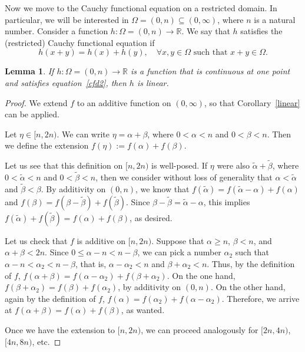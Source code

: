\documentclass[12pt,reqno]{amsart}
\theoremstyle{plain}
\newtheorem{lemma}[theorem]{Lemma} %
\numberwithin{equation}{section} %
\begin{document}
Now we move to the Cauchy functional equation on a restricted domain. In particular, we will be interested in $\Omega=(0,n)\subseteq (0,\infty)$, where $n$ is a natural number. Consider a function $h:\Omega=(0,n)\rightarrow\mathbb{R}$. We say that $h$ satisfies the (restricted) Cauchy functional equation if 
\begin{equation} h(x+y)=h(x)+h(y),\quad \forall x,y\in\Omega\text{ such that }x+y\in\Omega. 
\label{cfd2}
\end{equation}

\begin{lemma} \label{cfr}
If $h:\Omega=(0,n)\rightarrow\mathbb{R}$ is a function that is continuous at one point and satisfies equation~\eqref{cfd2}, then $h$ is linear.
\end{lemma}
\begin{proof}
We extend $f$ to an additive function on $(0,\infty)$, so that Corollary~\ref{linear} can be applied.

Let $\eta\in [n,2n)$. We can write $\eta=\alpha+\beta$, where $0<\alpha<n$ and $0<\beta<n$. Then we define the extension $f(\eta):=f(\alpha)+f(\beta)$.

Let us see that this definition on $[n,2n)$ is well-posed. If $\eta$ were also $\tilde{\alpha}+\tilde{\beta}$, where $0<\tilde{\alpha}<n$ and $0<\tilde{\beta}<n$, then we consider without loss of generality that $\alpha<\tilde{\alpha}$ and $\tilde{\beta}<\beta$. By additivity on $(0,n)$, we know that $f(\tilde{\alpha})=f(\tilde{\alpha}-\alpha)+f(\alpha)$ and $f(\beta)=f(\beta-\tilde{\beta})+f(\tilde{\beta})$. Since $\beta-\tilde{\beta}=\tilde{\alpha}-\alpha$, this implies $f(\tilde{\alpha})+f(\tilde{\beta})=f(\alpha)+f(\beta)$, as desired.

Let us check that $f$ is additive on $[n,2n)$. Suppose that $\alpha\geq n$, $\beta<n$, and $\alpha+\beta<2n$. Since $0\leq \alpha-n<n-\beta$, we can pick a number $\alpha_2$ such that $\alpha-n<\alpha_2<n-\beta$, that is, $\alpha-\alpha_2<n$ and $\beta+\alpha_2<n$. Thus, by the definition of $f$, $f(\alpha+\beta)=f(\alpha-\alpha_2)+f(\beta+\alpha_2)$. On the one hand, $f(\beta+\alpha_2)=f(\beta)+f(\alpha_2)$, by additivity on $(0,n)$. On the other hand, again by the definition of $f$, $f(\alpha)=f(\alpha_2)+f(\alpha-\alpha_2)$. Therefore, we arrive at $f(\alpha+\beta)=f(\alpha)+f(\beta)$, as wanted.

Once we have the extension to $[n,2n)$, we can proceed analogously for $[2n,4n)$, $[4n,8n)$, etc.
\end{proof}
\end{document}
